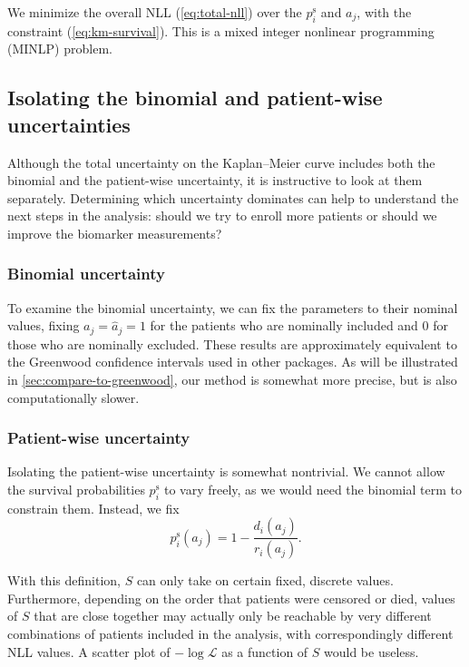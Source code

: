 \documentclass[article]{jss}
\newcommand{\KM}{Kaplan--Meier} %
\begin{document}
We minimize the overall NLL (\ref{eq:total-nll}) over the \(p_i^\text{s}\) and \(a_j\), with the constraint (\ref{eq:km-survival}). This is a mixed integer nonlinear programming (MINLP) problem.

\subsection{Isolating the binomial and patient-wise uncertainties}\label{sec:isolating-uncertainties}

Although the total uncertainty on the \KM{} curve includes both the binomial and the patient-wise uncertainty, it is instructive to look at them separately. Determining which uncertainty dominates can help to understand the next steps in the analysis: should we try to enroll more patients or should we improve the biomarker measurements?

\subsubsection{Binomial uncertainty}

To examine the binomial uncertainty, we can fix the parameters to their nominal values, fixing \(a_j=\hat{a}_j=1\) for the patients who are nominally included and \(0\) for those who are nominally excluded. These results are approximately equivalent to the Greenwood confidence intervals used in other packages. As will be illustrated in \cref{sec:compare-to-greenwood}, our method is somewhat more precise, but is also computationally slower.

\subsubsection{Patient-wise uncertainty}

Isolating the patient-wise uncertainty is somewhat nontrivial. We cannot allow the survival probabilities \(p_i^\text{s}\) to vary freely, as we would need the binomial term to constrain them. Instead, we fix
\begin{equation}
p_i^\text{s}(a_j) = 1 - \frac{d_i(a_j)}{r_i(a_j)}.
\end{equation}

With this definition, \(S\) can only take on certain fixed, discrete values. Furthermore, depending on the order that patients were censored or died, values of \(S\) that are close together may actually only be reachable by very different combinations of patients included in the analysis, with correspondingly different NLL values. A scatter plot of \(-\log\mathcal{L}\) as a function of \(S\) would be useless.
\end{document}

